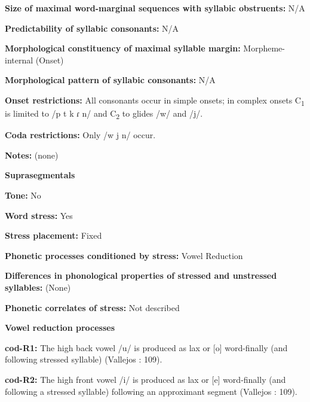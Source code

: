 \textbf{Size of maximal word{}-marginal sequences with syllabic obstruents:} N/A



\textbf{Predictability of syllabic consonants:} N/A



\textbf{Morphological constituency of maximal syllable margin:} Morpheme-internal (Onset)



\textbf{Morphological pattern of syllabic consonants:} N/A



\textbf{Onset restrictions:} All consonants occur in simple onsets; in complex onsets C\textsubscript{1} is limited to /p t k ɾ n/ and C\textsubscript{2} to glides /w/ and /j/.



\textbf{Coda restrictions:} Only /w j n/ occur.



\textbf{Notes:} (none)



\textbf{Suprasegmentals}



\textbf{Tone:} No



\textbf{Word stress:} Yes



\textbf{Stress placement:} Fixed



\textbf{Phonetic processes conditioned by stress:} Vowel Reduction



\textbf{Differences in phonological properties of stressed and unstressed syllables:} (None)



\textbf{Phonetic correlates of stress:} Not described



\textbf{Vowel reduction processes}



\textbf{cod-R1:} The high back vowel /u/ is produced as lax or [o] word-finally (and following stressed syllable) (Vallejos \citealt{Yopán2010}: 109).



\textbf{cod-R2:} The high front vowel /i/ is produced as lax or [e] word-finally (and following a stressed syllable) following an approximant segment (Vallejos \citealt{Yopán2010}: 109).



